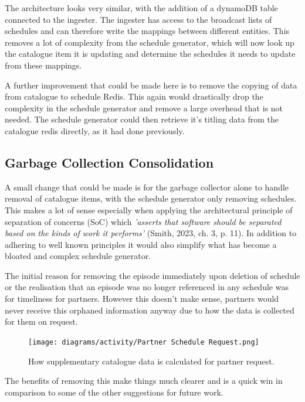   The architecture looks very similar, with the addition of a dynamoDB table connected to the ingester. The ingester has access to the broadcast lists 
  of schedules and can therefore write the mappings between different entities. This removes a lot of complexity from the schedule generator, which will 
  now look up the catalogue item it is updating and determine the schedules it needs to update from these mappings. 

  A further improvement that could be made here is to remove the copying of data from catalogue to schedule Redis. This again would drastically drop the 
  complexity in the schedule generator and remove a large overhead that is not needed. The schedule generator could then retrieve it's titling data from 
  the catalogue redis directly, as it had done previously.

  \newpage
  \subsection{Garbage Collection Consolidation}
  \label{sec:garbageCollectorConsolidation}

  A small change that could be made is for the garbage collector alone to handle removal of catalogue items, with the schedule generator only 
  removing schedules. This makes a lot of sense especially when applying the architectural principle of separation of concerns (SoC) which 
  \textit{'asserts that software should be separated based on the kinds of work it performs'} (Smith, 2023, ch. 3, p. 11). In addition to adhering 
  to well known principles it would also simplify what has become a bloated and complex schedule generator.

  The initial reason for removing the episode immediately upon deletion of schedule or the realisation that an episode was no longer referenced in 
  any schedule was for timeliness for partners. However this doesn't make sense, partners would never receive this orphaned information anyway due to 
  how the data is collected for them on request.

  \begin{figure}[H]
    \centering
    \texttt{[image: diagrams/activity/Partner Schedule Request.png]}
    \caption{How supplementary catalogue data is calculated for partner request.}
    \label{fig:partnerRequest}
  \end{figure}  

  The benefits of removing this make things much clearer and is a quick win in comparison to some of the other suggestions for future work.
  
\newpage
